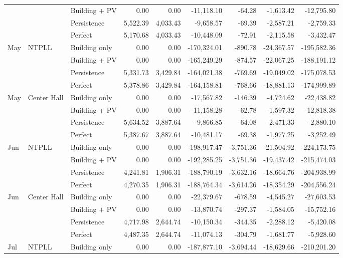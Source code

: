 \documentclass[final,5p,times]{elsarticle}
\begin{document}
\begin{table}[!t]
\begin{tabular}{@{}lllrrrrrr@{}}
 &  & Building + PV & 0.00 & 0.00 & -11,118.10 & -64.28 & -1,613.42 & -12,795.80 \\
 &  & Persistence & 5,522.39 & 4,033.43 & -9,658.57 & -69.39 & -2,587.21 & -2,759.33 \\
 &  & Perfect & 5,170.68 & 4,033.43 & -10,448.09 & -72.91 & -2,115.58 & -3,432.47 \\
\addlinespace[2pt]
May & NTPLL & Building only & 0.00 & 0.00 & -170,324.01 & -890.78 & -24,367.57 & -195,582.36 \\
 &  & Building + PV & 0.00 & 0.00 & -165,249.29 & -874.57 & -22,067.25 & -188,191.12 \\
 &  & Persistence & 5,331.73 & 3,429.84 & -164,021.38 & -769.69 & -19,049.02 & -175,078.53 \\
 &  & Perfect & 5,378.86 & 3,429.84 & -164,158.81 & -768.66 & -18,881.13 & -174,999.89 \\
\addlinespace[2pt]
May & Center Hall & Building only & 0.00 & 0.00 & -17,567.82 & -146.39 & -4,724.62 & -22,438.82 \\
 &  & Building + PV & 0.00 & 0.00 & -11,158.28 & -62.78 & -1,597.32 & -12,818.38 \\
 &  & Persistence & 5,634.52 & 3,887.64 & -9,866.85 & -64.08 & -2,471.33 & -2,880.10 \\
 &  & Perfect & 5,387.67 & 3,887.64 & -10,481.17 & -69.38 & -1,977.25 & -3,252.49 \\
\addlinespace[2pt]
Jun & NTPLL & Building only & 0.00 & 0.00 & -198,917.47 & -3,751.36 & -21,504.92 & -224,173.75 \\
 &  & Building + PV & 0.00 & 0.00 & -192,285.25 & -3,751.36 & -19,437.42 & -215,474.03 \\
 &  & Persistence & 4,241.81 & 1,906.31 & -188,790.19 & -3,632.16 & -18,664.76 & -204,938.99 \\
 &  & Perfect & 4,270.35 & 1,906.31 & -188,764.34 & -3,614.26 & -18,354.29 & -204,556.24 \\
\addlinespace[2pt]
Jun & Center Hall & Building only & 0.00 & 0.00 & -22,379.67 & -678.59 & -4,545.27 & -27,603.53 \\
 &  & Building + PV & 0.00 & 0.00 & -13,870.74 & -297.37 & -1,584.05 & -15,752.16 \\
 &  & Persistence & 4,717.98 & 2,644.74 & -10,150.34 & -344.35 & -2,288.12 & -5,420.08 \\
 &  & Perfect & 4,487.35 & 2,644.74 & -11,074.13 & -304.79 & -1,681.77 & -5,928.60 \\
\addlinespace[2pt]
Jul & NTPLL & Building only & 0.00 & 0.00 & -187,877.10 & -3,694.44 & -18,629.66 & -210,201.20 \\

\end{tabular}
\end{table}
\end{document}
